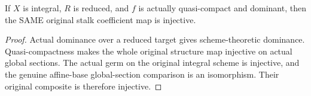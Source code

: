 \begin{lemma}
\label{alggeom:original-stalk-coefficient-injective}
\leanok
{}
If $X$ is integral, $R$ is reduced, and $f$ is actually quasi-compact and
dominant, then the SAME original stalk coefficient map is injective.
\end{lemma}
\begin{proof}
Actual dominance over a reduced target gives scheme-theoretic dominance.
Quasi-compactness makes the whole original structure map injective on actual
global sections. The actual germ on the original integral scheme is injective,
and the genuine affine-base global-section comparison is an isomorphism.
Their original composite is therefore injective.
\end{proof}
